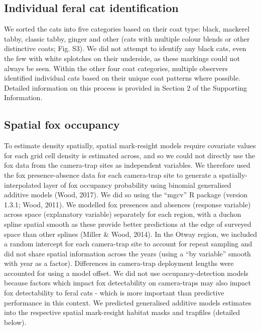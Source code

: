 \documentclass[]{elsarticle} %
\begin{document}
\hypertarget{individual-feral-cat-identification}{%
\subsection{Individual feral cat identification}\label{individual-feral-cat-identification}}

We sorted the cats into five categories based on their coat type: black, mackerel tabby, classic tabby, ginger and other (cats with multiple colour blends or other distinctive coats; Fig. S3). We did not attempt to identify any black cats, even the few with white splotches on their underside, as these markings could not always be seen. Within the other four coat categories, multiple observers identified individual cats based on their unique coat patterns where possible. Detailed information on this process is provided in Section 2 of the Supporting Information.

\hypertarget{spatial-fox-occupancy}{%
\subsection{Spatial fox occupancy}\label{spatial-fox-occupancy}}

To estimate density spatially, spatial mark-resight models require covariate values for each grid cell density is estimated across, and so we could not directly use the fox data from the camera-trap sites as independent variables. We therefore used the fox presence-absence data for each camera-trap site to generate a spatially-interpolated layer of fox occupancy probability using binomial generalised additive models (Wood, 2017). We did so using the ``mgcv'' R package (version 1.3.1; Wood, 2011). We modelled fox presences and absences (response variable) across space (explanatory variable) separately for each region, with a duchon spline spatial smooth as these provide better predictions at the edge of surveyed space than other splines (Miller \& Wood, 2014). In the Otway region, we included a random intercept for each camera-trap site to account for repeat sampling and did not share spatial information across the years (using a ``by variable'' smooth with year as a factor). Differences in camera-trap deployment lengths were accounted for using a model offset. We did not use occupancy-detection models because factors which impact fox detectability on camera-traps may also impact fox detectability to feral cats - which is more important than predictive performance in this context. We predicted generalised additive models estimates into the respective spatial mark-resight habitat masks and trapfiles (detailed below).
\end{document}
